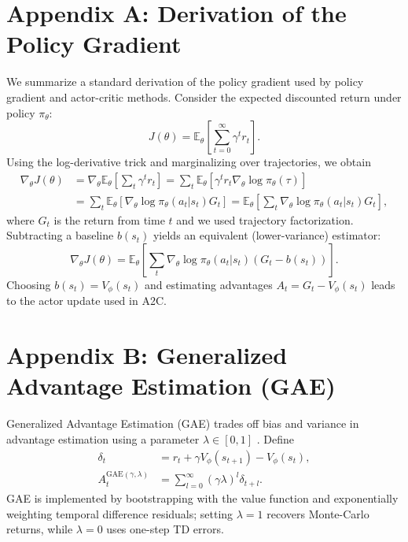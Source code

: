 \documentclass[11pt]{article}
\begin{document}
\appendix
\section{Appendix A: Derivation of the Policy Gradient}
We summarize a standard derivation of the policy gradient used by policy
gradient and actor-critic methods. Consider the expected discounted return
under policy $\pi_\theta$:
\begin{equation}
J(\theta) = \mathbb{E}_\theta\left[\sum_{t=0}^\infty \gamma^t r_t\right].
\end{equation}
Using the log-derivative trick and marginalizing over trajectories, we obtain
\begin{align}
\nabla_\theta J(\theta) &= \nabla_\theta \mathbb{E}_\theta\left[\sum_t \gamma^t r_t\right]
= \sum_t \mathbb{E}_\theta\left[\gamma^t r_t \nabla_\theta \log \pi_\theta(\tau)\right] \\
&= \sum_t \mathbb{E}_\theta\left[ \nabla_\theta \log \pi_\theta(a_t|s_t) G_t \right]
= \mathbb{E}_\theta\left[\sum_t \nabla_\theta \log \pi_\theta(a_t|s_t) G_t\right],
\end{align}
where $G_t$ is the return from time $t$ and we used trajectory factorization.
Subtracting a baseline $b(s_t)$ yields an equivalent (lower-variance) estimator:
\begin{equation}
\nabla_\theta J(\theta) = \mathbb{E}_\theta\left[\sum_t \nabla_\theta \log \pi_\theta(a_t|s_t) (G_t - b(s_t))\right].
\end{equation}
Choosing $b(s_t) = V_\phi(s_t)$ and estimating advantages $A_t = G_t - V_\phi(s_t)$
leads to the actor update used in A2C.

\section{Appendix B: Generalized Advantage Estimation (GAE)}
Generalized Advantage Estimation (GAE) trades off bias and variance in
advantage estimation using a parameter $\lambda\in[0,1]$ \cite{schulman2015high}. Define
\begin{align}
\delta_t &= r_t + \gamma V_\phi(s_{t+1}) - V_\phi(s_t), \\
A^{\text{GAE}(\gamma,\lambda)}_t &= \sum_{l=0}^{\infty} (\gamma\lambda)^l \delta_{t+l}.
\end{align}
GAE is implemented by bootstrapping with the value function and exponentially
weighting temporal difference residuals; setting $\lambda=1$ recovers Monte-Carlo
returns, while $\lambda=0$ uses one-step TD errors.
\end{document}
